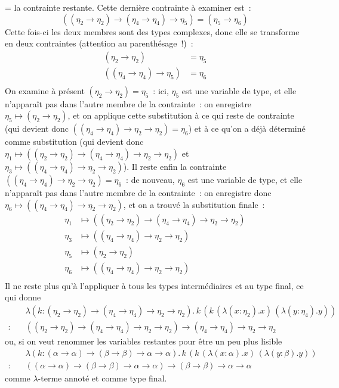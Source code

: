 \documentclass[12pt,a4paper]{article}
\theoremstyle{definition}
\newif\ifcorrige
\newenvironment{corrige}%
{\ifcorrige\relax\else\setbox0=\vbox\bgroup\fi%
\smallbreak\footnotesize\noindent{\underbar{\textit{Corrigé.}}\quad}}
{{\hbox{}\nobreak\hfill\checkmark}%
\ifcorrige\relax\else\egroup\fi\par}
\begin{document}
\begin{corrige}
la contrainte restante.  Cette dernière contrainte à examiner est :
\[
((\eta_2\to\eta_2)\to(\eta_4\to\eta_4)\to\eta_5) = (\eta_5\to\eta_6)
\]
Cette fois-ci les deux membres sont des types complexes, donc elle se
transforme en deux contraintes (attention au parenthésage !) :
\[
\begin{aligned}
(\eta_2\to\eta_2) &= \eta_5\\
((\eta_4\to\eta_4)\to\eta_5) &= \eta_6\\
\end{aligned}
\]
On examine à présent $(\eta_2\to\eta_2) = \eta_5$ : ici, $\eta_5$ est
une variable de type, et elle n'apparaît pas dans l'autre membre de la
contrainte : on enregistre $\eta_5 \mapsto (\eta_2\to\eta_2)$, et on
applique cette substitution à ce qui reste de contrainte (qui devient
donc $((\eta_4\to\eta_4)\to\eta_2\to\eta_2) = \eta_6$) et à ce qu'on a
déjà déterminé comme substitution (qui devient donc $\eta_1 \mapsto
((\eta_2\to\eta_2)\to(\eta_4\to\eta_4)\to\eta_2\to\eta_2)$ et $\eta_3
\mapsto ((\eta_4\to\eta_4)\to\eta_2\to\eta_2)$).  Il reste enfin la
contrainte $((\eta_4\to\eta_4)\to\eta_2\to\eta_2) = \eta_6$ : de
nouveau, $\eta_6$ est une variable de type, et elle n'apparaît pas
dans l'autre membre de la contrainte : on enregistre donc $\eta_6
\mapsto ((\eta_4\to\eta_4)\to\eta_2\to\eta_2)$, et on a trouvé la
substitution finale :
\[
\begin{aligned}
\eta_1 &\mapsto ((\eta_2\to\eta_2)\to(\eta_4\to\eta_4)\to\eta_2\to\eta_2)\\
\eta_3 &\mapsto ((\eta_4\to\eta_4)\to\eta_2\to\eta_2)\\
\eta_5 &\mapsto (\eta_2\to\eta_2)\\
\eta_6 &\mapsto ((\eta_4\to\eta_4)\to\eta_2\to\eta_2)\\
\end{aligned}
\]
Il ne reste plus qu'à l'appliquer à tous les types intermédiaires et
au type final, ce qui donne
\[
\begin{aligned}
&\lambda (k:(\eta_2\to\eta_2)\to(\eta_4\to\eta_4)\to\eta_2\to\eta_2). \, k\,(k\,(\lambda (x:\eta_2).x)\,(\lambda (y:\eta_4).y))\\
:\quad& ((\eta_2\to\eta_2)\to(\eta_4\to\eta_4)\to\eta_2\to\eta_2)
\to (\eta_4\to\eta_4)\to\eta_2\to\eta_2
\end{aligned}
\]
ou, si on veut renommer les variables restantes pour être un peu plus
lisible
\[
\begin{aligned}
&\lambda (k:(\alpha\to\alpha)\to(\beta\to\beta)\to\alpha\to\alpha). \, k\,(k\,(\lambda (x:\alpha).x)\,(\lambda (y:\beta).y))\\
:\quad& ((\alpha\to\alpha)\to(\beta\to\beta)\to\alpha\to\alpha)
\to (\beta\to\beta)\to\alpha\to\alpha
\end{aligned}
\]
comme $\lambda$-terme annoté et comme type final.
\end{corrige}
\end{document}
